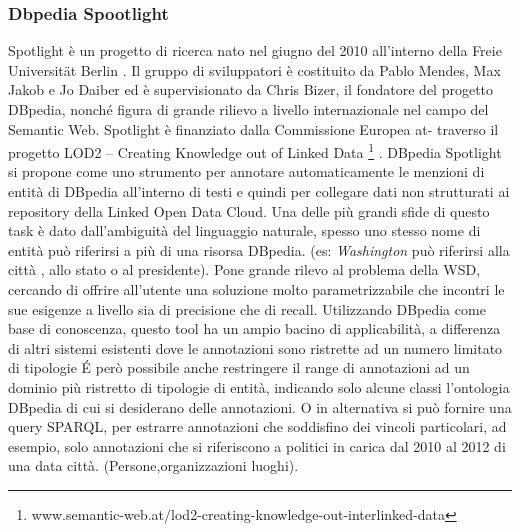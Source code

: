 \subsubsection{Dbpedia Spootlight}
Spotlight è un progetto di ricerca nato nel giugno del 2010 all'interno della Freie Universität Berlin . Il gruppo di sviluppatori è costituito da Pablo Mendes, Max Jakob e Jo Daiber ed è supervisionato da Chris Bizer, il fondatore del progetto DBpedia, nonché figura di grande rilievo a livello internazionale nel campo del Semantic Web. Spotlight è finanziato dalla Commissione Europea at-
traverso il progetto LOD2 – Creating Knowledge out of Linked Data \footnote{www.semantic-web.at/lod2-creating-knowledge-out-interlinked-data} .
DBpedia Spotlight \cite{isem2013daiber}  si propone come uno strumento per annotare automaticamente le
menzioni di entità di DBpedia all'interno di testi e quindi per collegare dati non strutturati ai repository della Linked Open Data Cloud.
Una delle più grandi sfide di questo task è dato dall'ambiguità del linguaggio naturale, spesso uno stesso nome di entità può riferirsi a più di una risorsa DBpedia. (es: \emph{Washington} può riferirsi alla città  , allo stato o al presidente).
Pone grande rilevo al problema della WSD, cercando di offrire all'utente una soluzione molto parametrizzabile che incontri le sue esigenze a livello sia di precisione che di recall.
Utilizzando DBpedia come base di conoscenza, questo tool ha un ampio bacino di applicabilità, a differenza di altri sistemi esistenti dove le annotazioni sono ristrette ad un numero  limitato di tipologie \'E però possibile anche restringere il range di annotazioni ad
 un dominio più ristretto di tipologie di entità, indicando solo alcune classi  l'ontologia DBpedia di cui si desiderano delle annotazioni. O in alternativa si può fornire una query SPARQL, per estrarre annotazioni che soddisfino dei vincoli particolari, ad esempio, solo annotazioni che si riferiscono a politici in carica dal 2010 al 2012 di una data città.  (Persone,organizzazioni luoghi).
 


